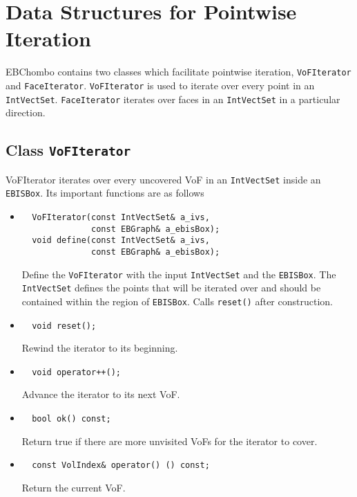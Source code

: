 \section{Data Structures for Pointwise Iteration}

EBChombo contains two classes which facilitate 
pointwise iteration, {\tt VoFIterator} and {\tt FaceIterator}. 
{\tt VoFIterator} is used to iterate over every point
in an {\tt IntVectSet}.  {\tt FaceIterator} iterates
over faces in an {\tt IntVectSet} in a particular direction.

\subsection{Class {\tt VoFIterator}}

VoFIterator iterates over every uncovered
VoF  in  an {\tt IntVectSet} inside an {\tt EBISBox}.
Its important functions are as follows
\begin{itemize}
\item \begin{verbatim}
  VoFIterator(const IntVectSet& a_ivs,
              const EBGraph& a_ebisBox);
  void define(const IntVectSet& a_ivs,
              const EBGraph& a_ebisBox);
\end{verbatim}
    Define the {\tt VoFIterator} with the input
    {\tt IntVectSet} and the {\tt EBISBox}.
    The {\tt IntVectSet} defines the points that
    will be iterated over and should be contained
    within the region of {\tt EBISBox}.  
    Calls {\tt reset()} after construction.

\item \begin{verbatim}
  void reset();
\end{verbatim}
  Rewind the iterator to its beginning.

\item \begin{verbatim}
  void operator++();
\end{verbatim}
 Advance the iterator to its next VoF.

\item \begin{verbatim}
  bool ok() const;
\end{verbatim}
Return true if there are more unvisited VoFs for
the iterator to cover.

\item \begin{verbatim}
  const VolIndex& operator() () const;
\end{verbatim}
Return the current VoF.
\end{itemize}
